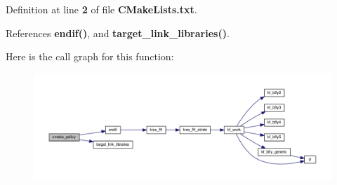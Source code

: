 Definition at line {\bf 2} of file {\bf C\+Make\+Lists.\+txt}.



References {\bf endif()}, and {\bf target\+\_\+link\+\_\+libraries()}.



Here is the call graph for this function\+:
\nopagebreak
\begin{figure}[H]
\begin{center}
\leavevmode
\includegraphics[width=350pt]{d9/d61/limesuite-dev_2mcu__program_2CMakeLists_8txt_a6f9b6f9b140c2e81bf682fdfe9a35e33_cgraph}
\end{center}
\end{figure}


